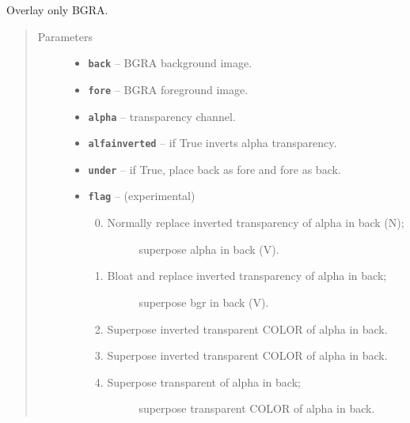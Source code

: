 \documentclass[letterpaper,10pt,english]{sphinxmanual}
\begin{document}
\begin{fulllineitems}
\label{RRtoolbox.lib.arrayops:RRtoolbox.lib.arrayops.basic.overlaypng}
Overlay only BGRA.
\begin{quote}\begin{description}
\item[{Parameters}] \leavevmode\begin{itemize}
\item {} 
\textbf{\texttt{back}} -- BGRA background image.

\item {} 
\textbf{\texttt{fore}} -- BGRA foreground image.

\item {} 
\textbf{\texttt{alpha}} -- transparency channel.

\item {} 
\textbf{\texttt{alfainverted}} -- if True inverts alpha transparency.

\item {} 
\textbf{\texttt{under}} -- if True, place back as fore and fore as back.

\item {} 
\textbf{\texttt{flag}} -- 
(experimental)
\begin{enumerate}
\setcounter{enumi}{-1}
\item {} \begin{description}
\item[{Normally replace inverted transparency of alpha in back (N);}] \leavevmode
superpose alpha in back (V).

\end{description}

\item {} \begin{description}
\item[{Bloat and replace inverted transparency of alpha in back;}] \leavevmode
superpose bgr in back (V).

\end{description}

\item {} 
Superpose inverted transparent COLOR of alpha in back.

\item {} 
Superpose inverted transparent COLOR of alpha in back.

\item {} \begin{description}
\item[{Superpose transparent of alpha in back;}] \leavevmode
superpose transparent COLOR of alpha in back.


\end{description}
\end{enumerate}
\end{itemize}
\end{description}
\end{quote}
\end{fulllineitems}
\end{document}
